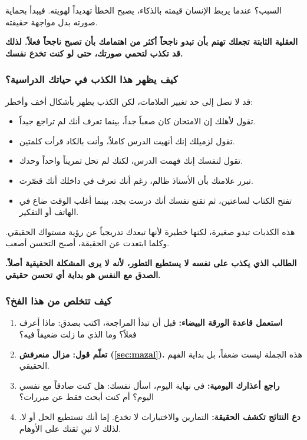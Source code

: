 \documentclass[12pt,a4paper]{book}
\newcommand{\importantAr}[1]{%
	\begin{important}
		\bfseries #1
	\end{important}
}
\begin{document}
	السبب؟ عندما يربط الإنسان قيمته بالذكاء، يصبح الخطأ تهديداً لهويته. فيبدأ بحماية صورته بدل مواجهة حقيقته.
	
	\importantAr{
		العقلية الثابتة تجعلك تهتم بأن تبدو ناجحاً أكثر من اهتمامك بأن تصبح ناجحاً فعلاً. لذلك قد تكذب لتحمي صورتك، حتى لو كنت تخدع نفسك.
	}
	
	\subsubsection*{كيف يظهر هذا الكذب في حياتك الدراسية؟}
	
	قد لا تصل إلى حد تغيير العلامات، لكن الكذب يظهر بأشكال أخف وأخطر:
	
	\begin{itemize}
		\item تقول لأهلك إن الامتحان كان صعباً جداً، بينما تعرف أنك لم تراجع جيداً.
		
		\item تقول لزميلك إنك أنهيت الدرس كاملاً، وأنت بالكاد قرأت كلمتين.
		
		\item تقول لنفسك إنك فهمت الدرس، لكنك لم تحل تمريناً واحداً وحدك.
		
		\item تبرر علامتك بأن الأستاذ ظالم، رغم أنك تعرف في داخلك أنك قصّرت.
		
		\item تفتح الكتاب لساعتين، ثم تقنع نفسك أنك درست بجد، بينما أغلب الوقت ضاع في الهاتف أو التفكير.
	\end{itemize}
	
	هذه الكذبات تبدو صغيرة، لكنها خطيرة لأنها تبعدك تدريجياً عن رؤية مستواك الحقيقي. وكلما ابتعدت عن الحقيقة، أصبح التحسن أصعب.
	
	\importantAr{
		الطالب الذي يكذب على نفسه لا يستطيع التطور، لأنه لا يرى المشكلة الحقيقية أصلاً. الصدق مع النفس هو بداية أي تحسن حقيقي.
	}
	
	\subsubsection*{كيف تتخلص من هذا الفخ؟}
	
	\begin{enumerate}
		\item \textbf{استعمل قاعدة الورقة البيضاء:} قبل أن تبدأ المراجعة، اكتب بصدق: ماذا أعرف فعلاً؟ وما الذي ما زلت ضعيفاً فيه؟
		
		\item \textbf{تعلّم قول: مزال منعرفش (\ref{sec:mazal}).} هذه الجملة ليست ضعفاً، بل بداية الفهم الحقيقي.
		
		\item \textbf{راجع أعذارك اليومية:} في نهاية اليوم، اسأل نفسك: هل كنت صادقاً مع نفسي اليوم؟ أم كنت أبحث فقط عن مبررات؟
		
		\item \textbf{دع النتائج تكشف الحقيقة:} التمارين والاختبارات لا تخدع. إما أنك تستطيع الحل أو لا. لذلك لا تبنِ ثقتك على الأوهام.
	\end{enumerate}
	
\end{document}
